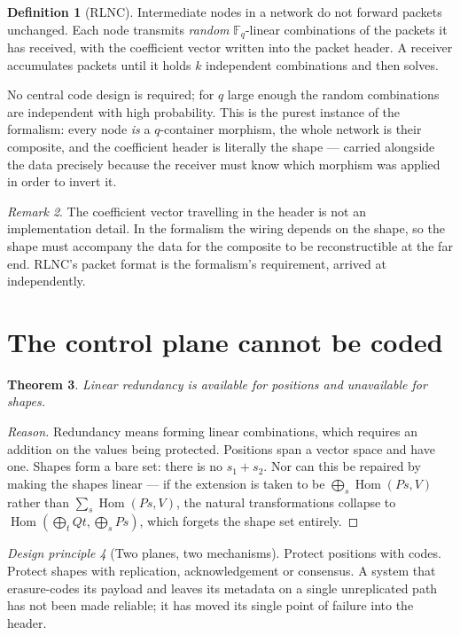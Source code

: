 \documentclass[11pt,a4paper]{article}
\newtheorem{theorem}{Theorem}[section]
\theoremstyle{definition}
\newtheorem{definition}[theorem]{Definition}
\theoremstyle{remark}
\newtheorem{remark}[theorem]{Remark}
\newtheorem{principle}[theorem]{Design principle}
\newcommand{\FF}{\mathbb{F}}
\DeclareMathOperator{\Hom}{Hom}
\begin{document}
\begin{definition}[RLNC]
Intermediate nodes in a network do not forward packets unchanged. Each node transmits
\emph{random} $\FF_q$-linear combinations of the packets it has received, with the
coefficient vector written into the packet header. A receiver accumulates packets
until it holds $k$ independent combinations and then solves.
\end{definition}

No central code design is required; for $q$ large enough the random combinations are
independent with high probability. This is the purest instance of the formalism:
every node \emph{is} a $q$-container morphism, the whole network is their composite,
and the coefficient header is literally the shape --- carried alongside the data
precisely because the receiver must know which morphism was applied in order to
invert it.

\begin{remark}
The coefficient vector travelling in the header is not an implementation detail. In
the formalism the wiring depends on the shape, so the shape must accompany the data
for the composite to be reconstructible at the far end. RLNC's packet format is the
formalism's requirement, arrived at independently.
\end{remark}

\section{The control plane cannot be coded}

\begin{theorem}
Linear redundancy is available for positions and unavailable for shapes.
\end{theorem}

\begin{proof}[Reason]
Redundancy means forming linear combinations, which requires an addition on the
values being protected. Positions span a vector space and have one. Shapes form a bare
set: there is no $s_1 + s_2$. Nor can this be repaired by making the shapes linear ---
if the extension is taken to be $\bigoplus_s \Hom(P s, V)$ rather than
$\sum_s \Hom(P s, V)$, the natural transformations collapse to
$\Hom(\bigoplus_t Q t, \bigoplus_s P s)$, which forgets the shape set entirely.
\end{proof}

\begin{principle}[Two planes, two mechanisms]
Protect positions with codes. Protect shapes with replication, acknowledgement or
consensus. A system that erasure-codes its payload and leaves its metadata on a single
unreplicated path has not been made reliable; it has moved its single point of failure
into the header.
\end{principle}
\end{document}
